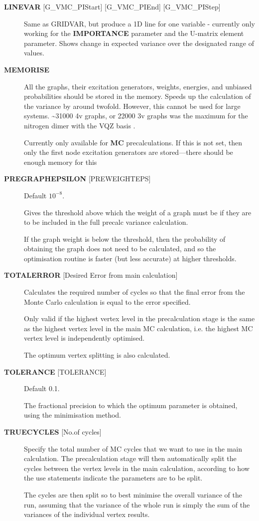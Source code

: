 \documentclass[openany,a4paper,10pt]{manual}
\begin{document}
\begin{description}
\item[\textbf{LINEVAR} {[}G\_VMC\_PIStart{]} {[}G\_VMC\_PIEnd{]} {[}G\_VMC\_PIStep{]}]
Same as GRIDVAR, but produce a 1D line for one variable - currently
only working for the \textbf{IMPORTANCE} parameter and the U-matrix element
parameter. Shows change in expected variance over the designated range
of values.

\item[\textbf{MEMORISE}]
All the graphs, their excitation generators, weights, energies, and
unbiased probabilities should be stored in the memory.  Speeds up
the calculation of the variance by around twofold. However, this
cannot be used for large systems.  \textasciitilde{}31000 4v graphs, or 22000 3v
graphs was the maximum for the nitrogen dimer with the VQZ basis .

Currently only available for \textbf{MC} precalculations. If this is not
set, then only the first node excitation generators are stored---there
should be enough memory for this

\item[\textbf{PREGRAPHEPSILON} {[}PREWEIGHTEPS{]}]
Default $10^{-8}$.

Gives the threshold above which the weight of a graph must be if
they are to be included in the full precalc variance calculation.

If the graph weight is below the threshold, then the probability
of obtaining the graph does not need to be calculated, and so
the optimisation routine is faster (but less accurate) at higher
thresholds.

\item[\textbf{TOTALERROR} {[}Desired Error from main calculation{]}]
Calculates the required number of cycles so that the final
error from the Monte Carlo calculation is equal to the error specified.

Only valid if the highest vertex level in the precalculation stage is the
same as the highest vertex level in the main MC calculation, i.e. the
highest MC vertex level is independently optimised.

The optimum vertex splitting is also calculated.

\item[\textbf{TOLERANCE} {[}TOLERANCE{]}]
Default 0.1.

The fractional precision to which the optimum parameter is obtained,
using the minimisation method.

\item[\textbf{TRUECYCLES} {[}No.of cycles{]}]
Specify the total number of MC cycles that we want to use in the
main calculation.  The precalculation stage will then automatically
split the cycles between the vertex levels in the main calculation,
according to how the use statements indicate the parameters are to
be split.

The cycles are then split so to best minimise the overall variance
of the run, assuming that the variance of the whole run is simply
the sum of the variances of the individual vertex results.

\end{description}
\end{document}
